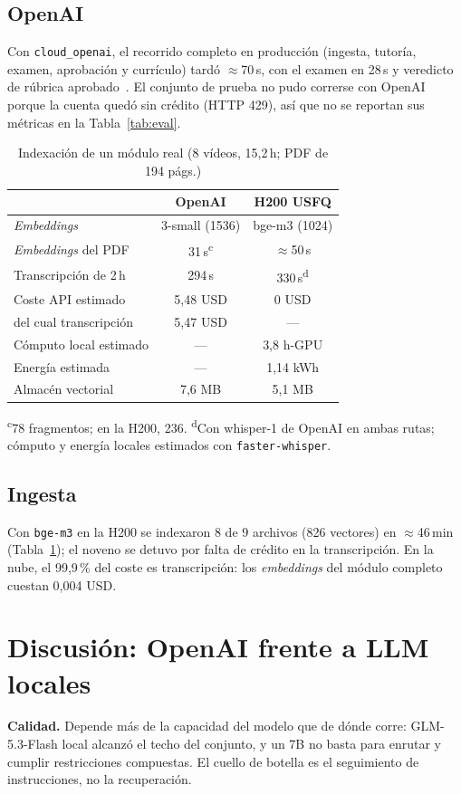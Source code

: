 \documentclass[journal]{IEEEtran}
\begin{document}
\subsection{OpenAI}
Con \texttt{cloud\_openai}, el recorrido completo en producción (ingesta, tutoría, examen,
aprobación y currículo) tardó $\approx$70\,s, con el examen en 28\,s y veredicto de rúbrica
aprobado~\cite{repo}. El conjunto de prueba no pudo correrse con OpenAI porque la cuenta
quedó sin crédito (HTTP 429), así que no se reportan sus métricas en la
Tabla~\ref{tab:eval}.

\begin{table}[!t]
\centering
\caption{Indexación de un módulo real (8 vídeos, 15,2\,h; PDF de 194 págs.)}
\label{tab:ingesta}
\begin{tabular}{@{}lcc@{}}
\toprule
 & OpenAI & H200 USFQ \\
\midrule
\emph{Embeddings} & 3-small (1536) & bge-m3 (1024) \\
\emph{Embeddings} del PDF & 31\,s\textsuperscript{c} & $\approx$50\,s \\
Transcripción de 2\,h & 294\,s & 330\,s\textsuperscript{d} \\
Coste API estimado & 5,48 USD & 0 USD \\
\quad del cual transcripción & 5,47 USD & --- \\
Cómputo local estimado & --- & 3,8 h-GPU \\
Energía estimada & --- & 1,14 kWh \\
Almacén vectorial & 7,6 MB & 5,1 MB \\
\bottomrule
\end{tabular}

\vspace{2pt}
\footnotesize\raggedright
\textsuperscript{c}78 fragmentos; en la H200, 236. \textsuperscript{d}Con whisper-1 de
OpenAI en ambas rutas; cómputo y energía locales estimados con \texttt{faster-whisper}.
\end{table}

\subsection{Ingesta}
Con \texttt{bge-m3} en la H200 se indexaron 8 de 9 archivos (826 vectores) en
$\approx$46\,min (Tabla~\ref{tab:ingesta}); el noveno se detuvo por falta de crédito en la
transcripción. En la nube, el 99,9\,\% del coste es transcripción: los \emph{embeddings}
del módulo completo cuestan 0,004 USD.

\section{Discusión: OpenAI frente a LLM locales}
\textbf{Calidad.} Depende más de la capacidad del modelo que de dónde corre: GLM-5.3-Flash
local alcanzó el techo del conjunto, y un 7B no basta para enrutar y cumplir restricciones
compuestas. El cuello de botella es el seguimiento de instrucciones, no la recuperación.
\end{document}
